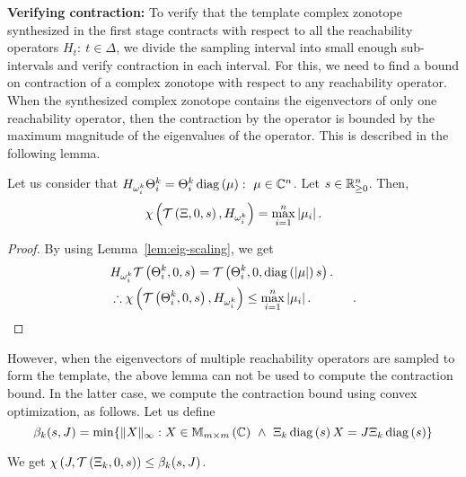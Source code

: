 {\bf Verifying contraction:} To verify that the template complex
zonotope synthesized in the first stage contracts with respect to all
the reachability operators $H_t:~t\in\Delta$, we divide the sampling
interval into small enough sub-intervals and verify contraction in
each interval.  For this, we need to find a bound on contraction of a
complex zonotope with respect to any reachability operator.  When the
synthesized complex zonotope contains the eigenvectors of only one
reachability operator, then the contraction by the operator is bounded
by the maximum magnitude of the eigenvalues of the operator.  This is
described in the following lemma.
%
\begin{lemma}
Let us consider that
$H_{\omega_i^k}\Theta_i^k=\Theta^k_i\diagonal{\mu}:~\mu\in\compnums^n$.
Let $\sfact\in\reals_{\geq 0}^n$.  Then,
%
\[
\contraction{H_{\omega^k_i}}{\tcztope{\eigenvectors}{0}{\sfact}}=\max_{i=1}^n\absolute{\mu_i}.
\]
%
\end{lemma}
%
\begin{proof}
  By using Lemma~\ref{lem:eig-scaling}, we get
%
\begin{align*}
&
 H_{\omega^k_i}\tcztope{\Theta^k_i}{0}{\sfact} =
 \tcztope{\Theta^k_i}{0}{\diagonal{\absolute{\mu}}{\sfact}}.\\
& \therefore  \contraction{H_{\omega^k_i}}{\tcztope{\Theta^k_i}{0}{\sfact}}\leq\max_{i=1}^n\absolute{\mu_i}.~\hspace{3em}\qedhere.
\end{align*}
\end{proof}
%
However, when the eigenvectors of multiple reachability operators are
sampled to form the template, the above lemma can not be used to
compute the contraction bound.  In the latter case, we compute the
contraction bound using convex optimization, as follows.  Let us
define
\[\beta_k(\sfact,J)=\min\{\|\tmat\|_\infty:\tmat\in\mat{m}{m}{\compnums}~\wedge~
\eigenvectors_k\diagonal{\sfact}X=J\eigenvectors_k\diagonal{\sfact}\}\] 
%
\begin{lemma}\label{lem:contLin}
We get $\chi\lt(J,\tcztope{\eigenvectors_k}{0}{\sfact}\rt)\leq \beta_k(\sfact,J)$.
%
\end{lemma}
%
